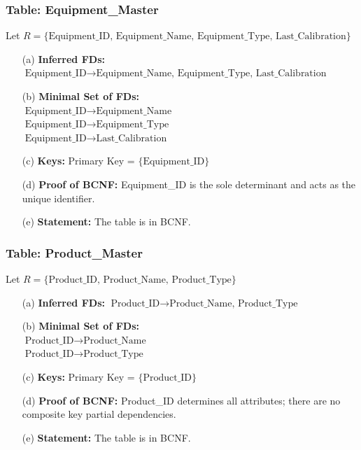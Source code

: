\documentclass[12pt, a4paper]{article}
\begin{document}
\subsubsection{Table: Equipment\_Master}
Let $R = \{ \text{Equipment\_ID, Equipment\_Name, Equipment\_Type, Last\_Calibration} \}$
\begin{enumerate}
    \item[(a)] \textbf{Inferred FDs:} $\text{Equipment\_ID} \rightarrow \text{Equipment\_Name, Equipment\_Type, Last\_Calibration}$
    \item[(b)] \textbf{Minimal Set of FDs:} 
    \\ $\text{Equipment\_ID} \rightarrow \text{Equipment\_Name}$
    \\ $\text{Equipment\_ID} \rightarrow \text{Equipment\_Type}$
    \\ $\text{Equipment\_ID} \rightarrow \text{Last\_Calibration}$
    \item[(c)] \textbf{Keys:} Primary Key = $\{ \text{Equipment\_ID} \}$
    \item[(d)] \textbf{Proof of BCNF:} Equipment\_ID is the sole determinant and acts as the unique identifier.
    \item[(e)] \textbf{Statement:} The table is in BCNF.
\end{enumerate}

\subsubsection{Table: Product\_Master}
Let $R = \{ \text{Product\_ID, Product\_Name, Product\_Type} \}$
\begin{enumerate}
    \item[(a)] \textbf{Inferred FDs:} $\text{Product\_ID} \rightarrow \text{Product\_Name, Product\_Type}$
    \item[(b)] \textbf{Minimal Set of FDs:} 
    \\ $\text{Product\_ID} \rightarrow \text{Product\_Name}$
    \\ $\text{Product\_ID} \rightarrow \text{Product\_Type}$
    \item[(c)] \textbf{Keys:} Primary Key = $\{ \text{Product\_ID} \}$
    \item[(d)] \textbf{Proof of BCNF:} Product\_ID determines all attributes; there are no composite key partial dependencies.
    \item[(e)] \textbf{Statement:} The table is in BCNF.
\end{enumerate}
\end{document}
